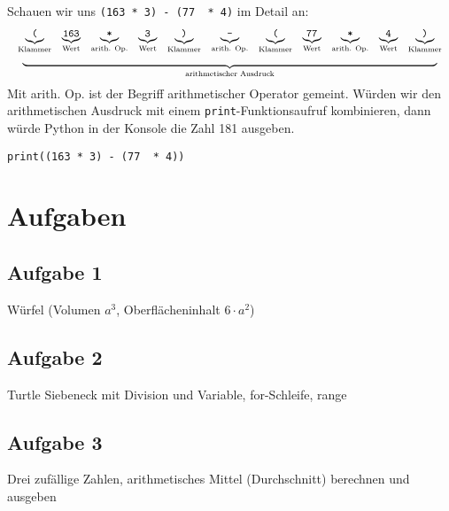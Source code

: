 \begin{example}
Schauen wir uns \lstinline{(163 * 3) - (77  * 4)} im Detail an:
$$
\begin{array}[t]{c}
\begin{array}[t]{cccccccccccc} 
\underbrace{\textrm{\texttt{(}}}_{\textrm{Klammer}} & \underbrace{\textrm{\texttt{163}}}_{\textrm{Wert}} & \underbrace{\textrm{\texttt{*}}}_{\textrm{arith. Op.}} & \underbrace{\textrm{\texttt{3}}}_{\textrm{Wert}} & \underbrace{\textrm{\texttt{)}}}_{\textrm{Klammer}} & \underbrace{\textrm{\texttt{-}}}_{\textrm{arith. Op.}} & \underbrace{\textrm{\texttt{(}}}_{\textrm{Klammer}} & \underbrace{\textrm{\texttt{77}}}_{\textrm{Wert}} & \underbrace{\textrm{\texttt{*}}}_{\textrm{arith. Op.}} & \underbrace{\textrm{\texttt{4}}}_{\textrm{Wert}} & \underbrace{\textrm{\texttt{)}}}_{\textrm{Klammer}}
\end{array} \\
\underbrace{\hspace{14cm}}_{\textrm{arithmetischer Ausdruck}}
\end{array}
$$
Mit arith. Op. ist der Begriff arithmetischer Operator gemeint. Würden wir den arithmetischen Ausdruck mit einem \lstinline{print}-Funktionsaufruf kombinieren, dann würde Python in der Konsole die Zahl \num{181} ausgeben.

\begin{lstlisting}
print((163 * 3) - (77  * 4))
\end{lstlisting}

\end{example}

\section{Aufgaben}

\subsection{Aufgabe 1}

Würfel (Volumen $a^3$, Oberflächeninhalt $6 \cdot a^2$)

\subsection{Aufgabe 2}

Turtle Siebeneck mit Division und Variable, for-Schleife, range

\subsection{Aufgabe 3}

Drei zufällige Zahlen, arithmetisches Mittel (Durchschnitt) berechnen und ausgeben

